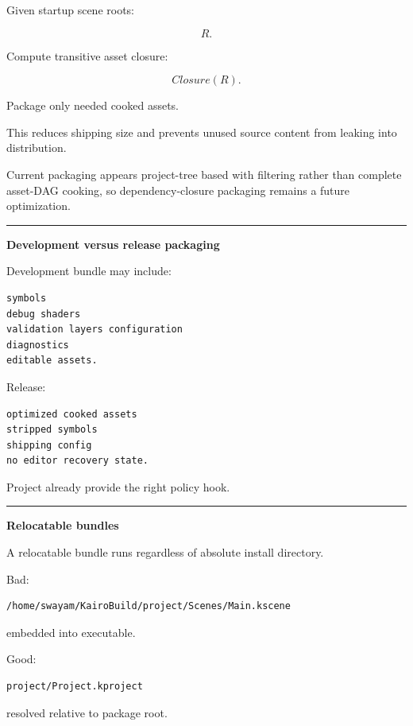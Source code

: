Given startup scene roots:

\[
R.
\]

Compute transitive asset closure:

\[
Closure(R).
\]

Package only needed cooked assets.

This reduces shipping size and prevents unused source content from leaking into distribution.

Current packaging appears project-tree based with filtering rather than complete asset-DAG cooking, so dependency-closure packaging remains a future optimization.

\begin{center}\rule{0.5\linewidth}{0.5pt}\end{center}

\textbf{Development versus release packaging}

Development bundle may include:

\begin{verbatim}
symbols
debug shaders
validation layers configuration
diagnostics
editable assets.
\end{verbatim}

Release:

\begin{verbatim}
optimized cooked assets
stripped symbols
shipping config
no editor recovery state.
\end{verbatim}

Project  already provide the right policy hook.

\begin{center}\rule{0.5\linewidth}{0.5pt}\end{center}

\textbf{Relocatable bundles}

A relocatable bundle runs regardless of absolute install directory.

Bad:

\begin{verbatim}
/home/swayam/KairoBuild/project/Scenes/Main.kscene
\end{verbatim}

embedded into executable.

Good:

\begin{verbatim}
project/Project.kproject
\end{verbatim}

resolved relative to package root.


